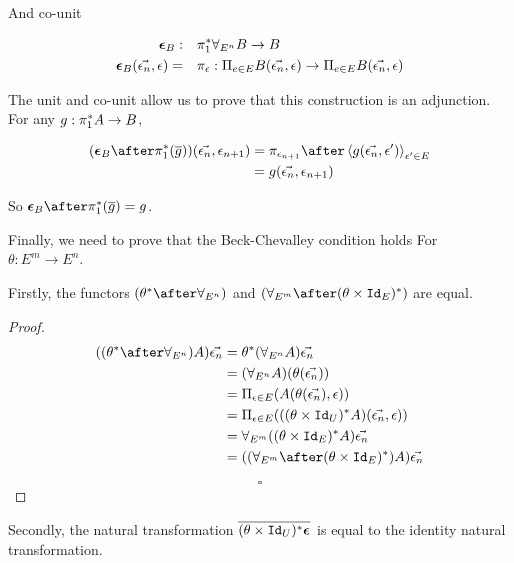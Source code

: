 \documentclass{Report}
\begin{document}
And co-unit


\begin{align}
    \boldsymbol{\epsilon}_{B} : &\quad \pi_1^*\forall_{E^n} B \rightarrow B\\
    \boldsymbol{\epsilon}_{B}(\vec{\epsilon_n}, \epsilon) =&\quad \pi_\epsilon : \Pi_{e\in E}B(\vec{\epsilon_n}, \epsilon)\rightarrow \Pi_{e\in E}B(\vec{\epsilon_n}, \epsilon)
\end{align}

The unit and co-unit allow us to prove that this construction is an adjunction. For any $g: \pi_1^* A \rightarrow B$,

\begin{align}
    (\counit{B}\after\pstar(\bar{g}))(\env, \e_{n+1}) & = \pi_{\e_{n+1}}\after\finpr{g(\env, \e')}{\e'\in E}\\
    &= g(\env, \e_{n+1})
\end{align}


So $\counit{B}\after\pstar(\bar{g}) = g$.


Finally, we need to prove that the Beck-Chevalley condition holds
For $\theta: E^m \rightarrow E^n$.


\begin{theorem}
    Firstly, the functors $(\theta\star\after\allEn)$ and $(\allEm\after(\theta\times\Id{E})\star)$ are equal.

\end{theorem}

\begin{proof}
    
\begin{align}
    ((\theta\star\after\allEn)A)\env &= \theta\star(\allEn A)\env\\
    &= (\allEn A)(\theta(\env))\\
    &= \Pi_{\e\in E}(A(\theta(\env), \e))\\
    &= \Pi_{\e\in E}(((\theta\times \Id{U})\star A)(\env, \e))\\
    &= \allEm((\theta\times\Id{E})\star A)\env\\
    &= ((\allEm\after(\theta\times\Id{E})\star)A)\env
\end{align}

$$\square$$
\end{proof}


\begin{theorem}
    Secondly, the natural transformation $\overline{(\theta\times\texttt{Id}_{U})^* \boldsymbol{\epsilon}_{}}$ is equal to the identity natural transformation.

\end{theorem}
\end{document}
